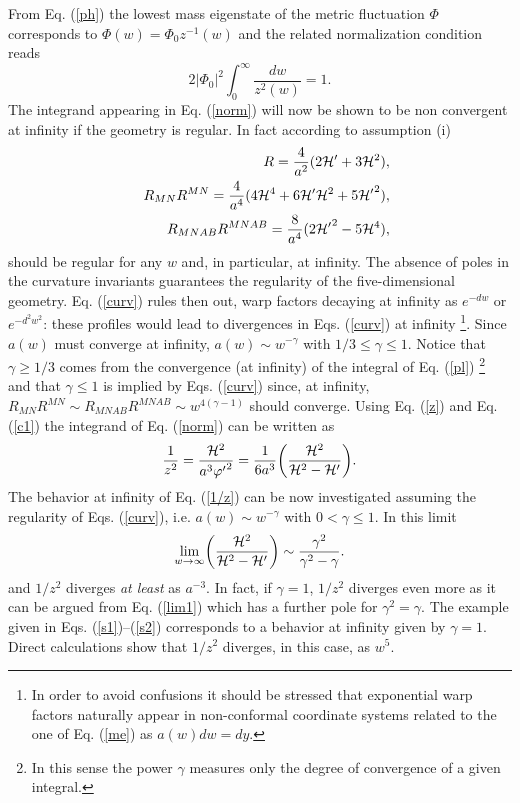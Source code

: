 \documentclass[a4paper,12pt]{article}
\begin{document}
From Eq. (\ref{ph}) the lowest mass eigenstate 
of the metric fluctuation $\Phi$ corresponds to 
$\Phi(w)= \Phi_0 z^{-1}(w)$ and the 
related normalization condition reads 
\begin{equation} 
2|\Phi_0|^2 \int_{0}^{\infty} \frac{dw}{z^2(w)}=1.
\label{norm}
\end{equation}
The integrand appearing in Eq. (\ref{norm}) will now be shown 
to be non convergent at infinity if the geometry is regular. In fact 
 according to assumption (i)
\begin{eqnarray}
&& R = \frac{4}{a^2} ( 2 {\cal H}' + 3 {\cal H}^2),
\nonumber\\
&&R_{M N}R^{M N} = \frac{4}{a^4}( 4 {\cal H}^4 + 6 {\cal H}' {\cal H}^2
+ 5 {{\cal H}'}^2),
\nonumber\\
&& R_{M N A B}R^{M N A B} = \frac{8}{a^4}( 
2 {{\cal H}'}^2 - 5 {\cal H}^4),
\label{curv}
\end{eqnarray}
should be regular for any $w$ and, in particular, at infinity. The absence 
of poles in the curvature invariants guarantees the regularity of the 
five-dimensional geometry. 
Eq. (\ref{curv}) rules then out,  
warp factors decaying at infinity as $e^{-d w}$ or $e^{- d^2 w^2}$: these
profiles would lead to divergences in Eqs. (\ref{curv}) at infinity 
\footnote{In order to avoid confusions it should be stressed that 
exponential warp factors naturally appear in non-conformal coordinate systems
related to the one of Eq. (\ref{me}) as $a(w) dw = dy$.}.
Since $a(w)$ must converge at infinity,  $a(w) \sim w^{-\gamma}$
with $1/3\leq\gamma \leq 1$. Notice that $\gamma\geq 1/3$ 
comes  from the
 convergence (at infinity) of the integral of Eq. (\ref{pl}) \footnote{ 
In this sense the power $\gamma$ measures only the degree of convergence 
of a given integral.} and that $\gamma \leq 1$ is implied 
by Eqs. (\ref{curv}) since, at infinity, 
$R_{M N}R^{M N} \sim R_{M N A B} R^{M N A B } \sim 
w^{4 ( \gamma - 1)}$ should converge.
Using  Eq. (\ref{z}) and Eq. (\ref{c1}) the integrand of Eq. (\ref{norm})
can be written as 
\begin{equation}
\frac{1}{z^2} = \frac{{\cal H}^2}{a^3 {\varphi'}^2} = \frac{1}{6a^3}
\biggl(\frac{{\cal H}^2}{ {\cal H}^2 - {\cal H}'}\biggr).
\label{1/z}
\end{equation}
The behavior at infinity of Eq. (\ref{1/z}) can be now investigated assuming
the regularity of Eqs. (\ref{curv}), i.e. 
 $a(w) \sim w^{-\gamma}$ with $0< \gamma \leq 1$. In this limit 
\begin{equation}
\lim_{w\rightarrow \infty} \biggl(\frac{{\cal H}^2}{{\cal H}^2 
- {\cal H}'} \biggr)\sim \frac{\gamma^2}{\gamma^2 -\gamma} .
\label{lim1}
\end{equation}
and $1/z^2$ diverges {\em at least} as $a^{-3}$. In fact, if  $\gamma =1$, 
$1/z^2$ diverges even more as it can be argued from Eq. (\ref{lim1}) which 
has a further pole for $\gamma^2 = \gamma$. 
The  example given in Eqs. (\ref{s1})--(\ref{s2}) corresponds to 
a behavior at infinity given by $\gamma=1$.  
Direct calculations show that $1/z^2$ diverges, in this case,  as $w^5$.
\end{document}
